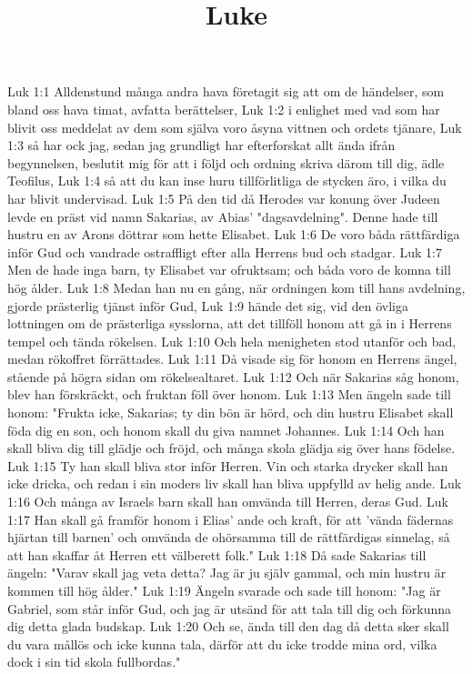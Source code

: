 

\title{Luke}

Luk 1:1  Alldenstund många andra hava företagit sig att om de händelser, som bland oss hava timat, avfatta berättelser,
Luk 1:2  i enlighet med vad som har blivit oss meddelat av dem som själva voro åsyna vittnen och ordets tjänare,
Luk 1:3  så har ock jag, sedan jag grundligt har efterforskat allt ända ifrån begynnelsen, beslutit mig för att i följd och ordning skriva därom till dig, ädle Teofilus,
Luk 1:4  så att du kan inse huru tillförlitliga de stycken äro, i vilka du har blivit undervisad.
Luk 1:5  På den tid då Herodes var konung över Judeen levde en präst vid namn Sakarias, av Abias' "dagsavdelning". Denne hade till hustru en av Arons döttrar som hette Elisabet.
Luk 1:6  De voro båda rättfärdiga inför Gud och vandrade ostraffligt efter alla Herrens bud och stadgar.
Luk 1:7  Men de hade inga barn, ty Elisabet var ofruktsam; och båda voro de komna till hög ålder.
Luk 1:8  Medan han nu en gång, när ordningen kom till hans avdelning, gjorde prästerlig tjänst inför Gud,
Luk 1:9  hände det sig, vid den övliga lottningen om de prästerliga sysslorna, att det tillföll honom att gå in i Herrens tempel och tända rökelsen.
Luk 1:10  Och hela menigheten stod utanför och bad, medan rökoffret förrättades.
Luk 1:11  Då visade sig för honom en Herrens ängel, stående på högra sidan om rökelsealtaret.
Luk 1:12  Och när Sakarias såg honom, blev han förskräckt, och fruktan föll över honom.
Luk 1:13  Men ängeln sade till honom: "Frukta icke, Sakarias; ty din bön är hörd, och din hustru Elisabet skall föda dig en son, och honom skall du giva namnet Johannes.
Luk 1:14  Och han skall bliva dig till glädje och fröjd, och många skola glädja sig över hans födelse.
Luk 1:15  Ty han skall bliva stor inför Herren. Vin och starka drycker skall han icke dricka, och redan i sin moders liv skall han bliva uppfylld av helig ande.
Luk 1:16  Och många av Israels barn skall han omvända till Herren, deras Gud.
Luk 1:17  Han skall gå framför honom i Elias' ande och kraft, för att 'vända fädernas hjärtan till barnen' och omvända de ohörsamma till de rättfärdigas sinnelag, så att han skaffar åt Herren ett välberett folk."
Luk 1:18  Då sade Sakarias till ängeln: "Varav skall jag veta detta? Jag är ju själv gammal, och min hustru är kommen till hög ålder."
Luk 1:19  Ängeln svarade och sade till honom: "Jag är Gabriel, som står inför Gud, och jag är utsänd för att tala till dig och förkunna dig detta glada budskap.
Luk 1:20  Och se, ända till den dag då detta sker skall du vara mållös och icke kunna tala, därför att du icke trodde mina ord, vilka dock i sin tid skola fullbordas."
